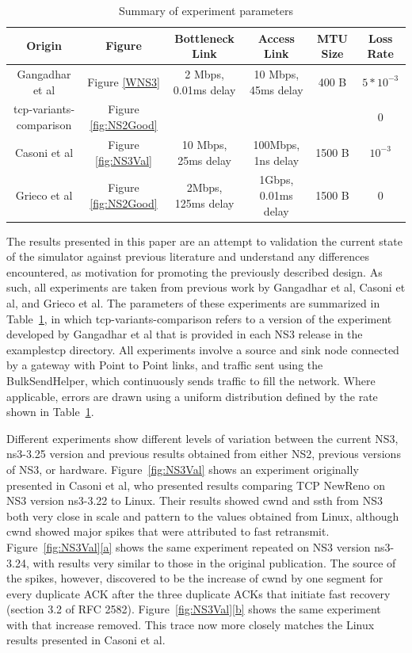 \documentclass[conference]{IEEEtran}
\begin{document}
\begin{table}[!t]
\renewcommand{\arraystretch}{1.3}
\caption{Summary of experiment parameters} 
\label{table:exps}
\centering
\begin{tabular}{|c||c||c||c||c||c|}
\hline
\textbf{Origin} & \textbf{Figure} & \textbf{Bottleneck Link} & \textbf{Access Link} & \textbf{MTU Size} & \textbf{Loss Rate} \\ 
\hline
Gangadhar et al\cite{NS3W} & Figure \ref{WNS3} & 2 Mbps, 0.01ms delay & 10 Mbps, 45ms delay & 400 B & $5*10^{-3}$ \\
tcp-variants-comparison & Figure \ref{fig:NS2Good} &  &  &  & 0 \\
\hline
Casoni et al\cite{NS3Val} & Figure \ref{fig:NS3Val} & 10 Mbps, 25ms delay & 100Mbps, 1ns delay & 1500 B & $10^{-3}$ \\
\hline
Grieco et al\cite{NS2WP} & Figure \ref{fig:NS2Good} & 2Mbps, 125ms delay & 1Gbps, 0.01ms delay & 1500 B & 0 \\
\hline
\end{tabular}
\end{table}

The results presented in this paper are an attempt to validation the current state of the simulator against previous literature and understand any differences encountered, as motivation for promoting the previously described design. As such, all experiments are taken from previous work by Gangadhar et al\cite{NS3W}, Casoni et al\cite{NS3Val}, and Grieco et al\cite{NS2WP}. The parameters of these experiments are summarized in Table~\ref{table:exps}, in which tcp-variants-comparison refers to a version of the experiment developed by Gangadhar et al\cite{NS3W} that is provided in each NS3 release in the examples\/tcp directory. All experiments involve a source and sink node connected by a gateway with Point to Point links, and traffic sent using the BulkSendHelper, which continuously sends traffic to fill the network. Where applicable, errors are drawn using a uniform distribution defined by the rate shown in Table~\ref{table:exps}. 

Different experiments show different levels of variation between the current NS3, ns3-3.25 version and previous results obtained from either NS2, previous versions of NS3, or hardware. Figure~\ref{fig:NS3Val} shows an experiment originally presented in Casoni et al\cite{NS3Val}, who presented results comparing TCP NewReno on NS3 version ns3-3.22 to Linux. Their results showed cwnd and ssth from NS3 both very close in scale and pattern to the values obtained from Linux, although cwnd showed major spikes that were attributed to fast retransmit. Figure~\ref{fig:NS3Val}\ref{a} shows the same experiment repeated on NS3 version ns3-3.24, with results very similar to those in the original publication. The source of the spikes, however, discovered to be the increase of cwnd by one segment for every duplicate ACK after the three duplicate ACKs that initiate fast recovery (section 3.2 of RFC 2582\cite{RFC2582}). Figure~\ref{fig:NS3Val}\ref{b} shows the same experiment with that increase removed. This trace now more closely matches the Linux results presented in Casoni et al\cite{NS3Val}.
\end{document}
